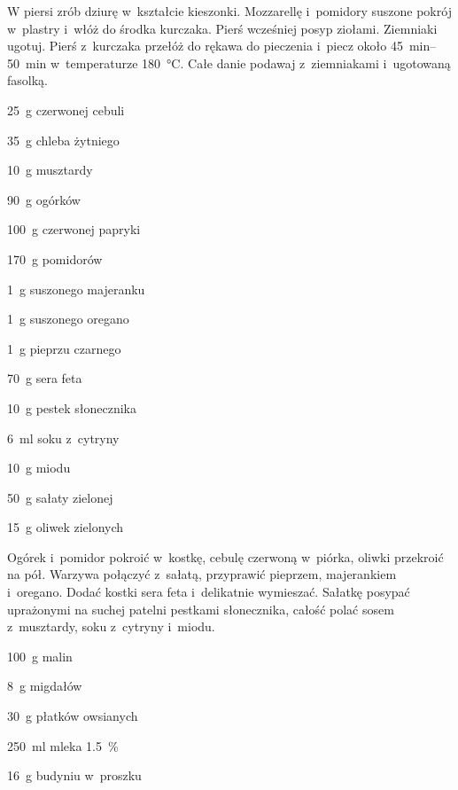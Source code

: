\documentclass[../main.tex]{subfiles}
\begin{document}
W piersi zrób dziurę w~kształcie kieszonki. Mozzarellę i~pomidory suszone
pokrój w~plastry i~włóż do środka kurczaka. Pierś wcześniej posyp ziołami.
Ziemniaki ugotuj. Pierś z~kurczaka przełóż do rękawa do pieczenia i~piecz około
\qtyrange{45}{50}{\minute} w~temperaturze \qty{180}{\celsius}. Całe danie
podawaj z~ziemniakami i~ugotowaną fasolką.


\begin{Ingred}
    \item \qty{25}{\gram} czerwonej cebuli
    \item \qty{35}{\gram} chleba żytniego
    \item \qty{10}{\gram} musztardy
    \item \qty{90}{\gram} ogórków
    \item \qty{100}{\gram} czerwonej papryki
    \item \qty{170}{\gram} pomidorów
    \item \qty{1}{\gram} suszonego majeranku
    \item \qty{1}{\gram} suszonego oregano
    \item \qty{1}{\gram} pieprzu czarnego
    \item \qty{70}{\gram} sera feta
    \item \qty{10}{\gram} pestek słonecznika
    \item \qty{6}{\milli\litre} soku z~cytryny
    \item \qty{10}{\gram} miodu
    \item \qty{50}{\gram} sałaty zielonej
    \item \qty{15}{\gram} oliwek zielonych
\end{Ingred}

Ogórek i~pomidor pokroić w~kostkę, cebulę czerwoną w~piórka, oliwki przekroić
na pół. Warzywa połączyć z~sałatą, przyprawić pieprzem, majerankiem i~oregano.
Dodać kostki sera feta i~delikatnie wymieszać. Sałatkę posypać uprażonymi na
suchej patelni pestkami słonecznika, całość polać sosem z~musztardy, soku
z~cytryny i~miodu.


\begin{Ingred}
    \item \qty{100}{\gram} malin
    \item \qty{8}{\gram} migdałów
    \item \qty{30}{\gram} płatków owsianych
    \item \qty{250}{\milli\litre} mleka \qty{1.5}{\percent}
    \item \qty{16}{\gram} budyniu w~proszku
\end{Ingred}
\end{document}

